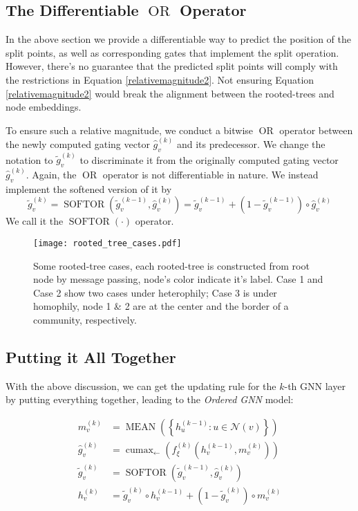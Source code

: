 \documentclass{article}
\begin{document}
\subsection{The Differentiable $\operatorname{OR}$ Operator}
In the above section we provide a differentiable way to predict the position of the split points, as well as corresponding gates that implement the split operation. However, there's no guarantee that the predicted split points will comply with the restrictions in Equation \ref{relativemagnitude2}. Not ensuring Equation \ref{relativemagnitude2} would break the alignment between the rooted-trees and node embeddings. 

To ensure such a relative magnitude, we conduct a bitwise $\operatorname{OR}$ operator between the newly computed gating vector $\hat{g}_{v}^{(k)}$ and its predecessor. We change the notation to $\tilde{g}_{v}^{(k)}$ to discriminate it from the originally computed gating vector $\hat{g}_{v}^{(k)}$. Again, the $\operatorname{OR}$ operator is not differentiable in nature. We instead implement the softened version of it by 
\begin{equation}
\label{softor}
\tilde{g}_{v}^{(k)} = \operatorname{SOFTOR}(\tilde{g}_{v}^{(k-1)}, \hat{g}_{v}^{(k)}) = \tilde{g}_{v}^{(k-1)} + (1-\tilde{g}_{v}^{(k-1)}) \circ \hat{g}_{v}^{(k)}
\end{equation}
We call it the $\operatorname{SOFTOR}(\cdot)$ operator.


\begin{figure}\centering
\texttt{[image: rooted\_tree\_cases.pdf]}
\caption{Some rooted-tree cases, each rooted-tree is constructed from root node by message passing, node's color indicate it's label. Case 1 and Case 2 show two cases under heterophily; Case 3 is under homophily, node 1 \& 2 are at the center and the border of a community, respectively.}
\label{fig.showing_cases}
\end{figure}


\subsection{Putting it All Together}
\label{puttogether}
With the above discussion, we can get the updating rule for the $k$-th GNN layer by putting everything together, leading to the \textit{Ordered GNN} model:

\begin{equation}
\begin{aligned}
m_{v}^{(k)}&=\operatorname{MEAN}\left(\left\{h_{u}^{(k-1)}: u \in \mathcal{N}(v)\right\}\right) \\
\hat{g}_{v}^{(k)}&=\operatorname{cumax}_{\leftarrow}\left( f_{\xi}^{(k)} \left( h_{v}^{(k-1)}, m_{v}^{(k)} \right) \right) \\ \tilde{g}_{v}^{(k)}&=\operatorname{SOFTOR}\left(\tilde{g}_{v}^{(k-1)}, \hat{g}_{v}^{(k)}\right)\\
h_{v}^{(k)}&=\tilde{g}_{v}^{(k)} \circ h_{v}^{(k-1)} + \left(1-\tilde{g}_{v}^{(k)}\right) \circ m_{v}^{(k)}
\end{aligned}
\end{equation}
\end{document}
